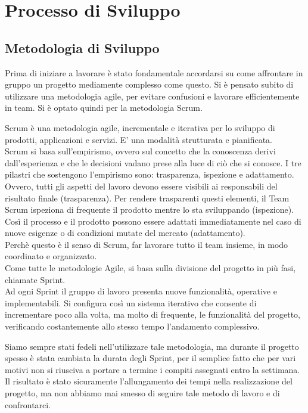 \chapter{Processo di Sviluppo}


\section{Metodologia di Sviluppo}
Prima di iniziare a lavorare è stato fondamentale accordarsi su come affrontare in gruppo un progetto mediamente complesso come questo. Si è pensato subito di utilizzare una metodologia agile, per evitare confusioni e lavorare efficientemente in team. Si è optato quindi per la metodologia Scrum.\vspace{0.5cm}

    Scrum è una metodologia agile, incrementale e iterativa per lo sviluppo di prodotti, applicazioni e servizi. E' una modalità strutturata e pianificata.\\
    Scrum si basa sull’empirismo, ovvero sul concetto che la conoscenza derivi dall’esperienza e che le decisioni vadano prese alla luce di ciò che si conosce. I tre pilastri che sostengono l’empirismo sono: trasparenza, ispezione e adattamento.\\
    Ovvero, tutti gli aspetti del lavoro devono essere visibili ai responsabili del risultato finale (trasparenza). Per rendere trasparenti questi elementi, il Team Scrum ispeziona di frequente il prodotto mentre lo sta sviluppando (ispezione). Così il processo e il prodotto possono essere adattati immediatamente nel caso di nuove esigenze o di condizioni mutate del mercato (adattamento).\\ 
    Perchè questo è il senso di Scrum, far lavorare tutto il team insieme, in modo coordinato e organizzato.\\
    Come tutte le metodologie Agile, si basa sulla divisione del progetto in più fasi, chiamate Sprint.\\
Ad ogni Sprint il gruppo di lavoro presenta nuove funzionalità, operative e implementabili. Si configura così un sistema iterativo che consente di incrementare poco alla volta, ma molto di frequente, le funzionalità del progetto, verificando costantemente allo stesso tempo l'andamento complessivo.\vspace{0.5cm}

Siamo sempre stati fedeli nell'utilizzare tale metodologia, ma durante il progetto spesso è stata cambiata la durata degli Sprint, per il semplice fatto che per vari motivi non si riusciva a portare a termine i compiti assegnati entro la settimana. Il risultato è stato sicuramente l'allungamento dei tempi nella realizzazione del progetto, ma non abbiamo mai smesso di seguire tale metodo di lavoro e di confrontarci.

